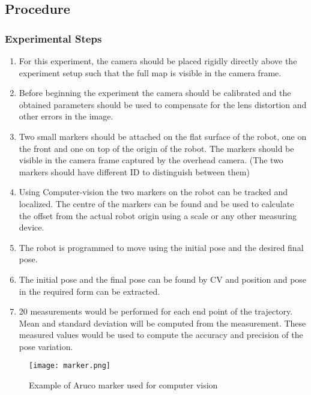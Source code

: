 \documentclass[10pt,a4paper]{article}
\begin{document}
\subsection{Procedure}
	\subsubsection{Experimental Steps}
	
\begin{enumerate}
	\item
	For this experiment, the camera should be placed rigidly directly above the experiment setup such that the full map is visible in the camera frame. 
	\item
	Before beginning the experiment the camera should be calibrated and the obtained parameters should be used to compensate for the lens distortion and other errors in the image. 
	\item
	Two small markers should be attached on the flat surface of the robot, one on the front and one on top of the origin of the robot. The markers should be visible in the camera frame captured by the overhead camera. (The two markers should have different ID to distinguish between them)
	\item
    Using Computer-vision the two markers on the robot can be tracked and localized. The centre of the markers can be found and be used to calculate the offset from the actual robot origin using a scale or any other measuring device.
	\item
	The robot is programmed to move using the initial pose and the desired final pose.
	\item
	The initial pose and the final pose can be found by CV and position and pose in the required form can be extracted.
	\item
	20 measurements would be performed for each end point of the trajectory. Mean and standard deviation will be computed from the measurement. These measured values would be used to compute the accuracy and precision of the pose variation. 
	
\end{enumerate}

\vspace{0.5cm}

\begin{figure}[h]
	\centering
	\texttt{[image: marker.png]}
	\caption{ Example of Aruco marker used for computer vision}
\end{figure}
\end{document}
